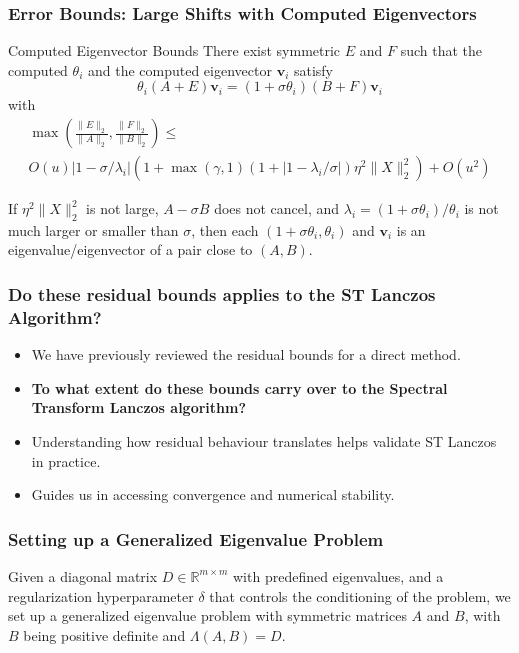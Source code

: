 \documentclass[landscape]{beamer}
\renewcommand{\vec}[1]{\bm{#1}}
\begin{document}
\begin{frame}
  \frametitle{Error Bounds: Large Shifts with Computed Eigenvectors}

  \begin{block}{Computed Eigenvector Bounds}
    There exist symmetric $E$ and $F$ such that the computed
    $\theta_i$ and the computed eigenvector $\vec{v}_i$ satisfy
    \begin{equation*}
      \theta_i (A+E) \vec{v}_i = (1+\sigma \theta_i) (B+F) \vec{v}_i
    \end{equation*}
    with
    \begin{multline*}
      \max\left(\frac{\|E\|_2}{\|A\|_2}, \frac{\|F\|_2}{\|B\|_2}\right) \leq  \\
      O(u) |1-\sigma/\lambda_i| \left(1 + \max(\gamma,1)
      \left(1+ |1-\lambda_i/\sigma|\right)\eta^2\|X\|_2^2\right) + O(u^2)
    \end{multline*}
  \end{block}
  If $\eta^2 \|X\|_2^2$ is not large, $A-\sigma B$ does not cancel,
  and $\lambda_i = (1+\sigma\theta_i)/\theta_i$ is not much larger or
  smaller than $\sigma$, then each $(1+\sigma \theta_i, \theta_i)$ and
  $\vec{v}_i$ is an eigenvalue/eigenvector of a pair close to $(A,B)$.
\end{frame}

\begin{frame}
	\frametitle{Do these residual bounds applies to the ST Lanczos Algorithm?}
	\begin{itemize}
		\item We have previously reviewed the residual bounds for a direct method.
		\item \textbf{To what extent do these bounds carry over to the Spectral Transform Lanczos algorithm?}
		\item Understanding how residual behaviour translates helps validate ST Lanczos in practice.
		\item Guides us in accessing convergence and numerical stability.
	\end{itemize}
\end{frame}

\begin{frame}
  \frametitle{Setting up a Generalized Eigenvalue Problem}

	Given a diagonal matrix $D \in \mathbb{R}^{m \times m}$ with predefined eigenvalues, and a regularization hyperparameter $\delta$ that controls the conditioning of the problem, we set up a generalized eigenvalue problem with symmetric matrices $A$ and $B$, with $B$ being positive definite and $\Lambda(A, B) = D$.
\end{frame}
\end{document}
